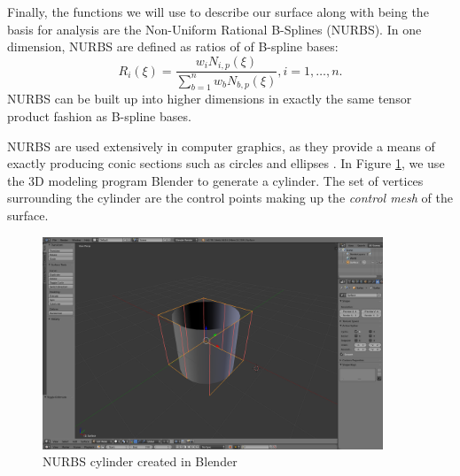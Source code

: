 \documentclass[./]{subfiles}
\begin{document}
Finally, the functions we will use to describe our surface along with being the basis for analysis are the Non-Uniform Rational B-Splines (NURBS). In one dimension, NURBS are defined as ratios of of B-spline bases:
\begin{equation}
R_i(\xi) = \frac{w_i N_{i,p}(\xi)}{\sum_{b=1}^{n} w_b N_{b,p}(\xi)}, i = 1, \dots, n.
\end{equation}
NURBS can be built up into higher dimensions in exactly the same tensor product fashion as B-spline bases. 

NURBS are used extensively in computer graphics, as they provide a means of exactly producing conic sections such as circles and ellipses \cite{piegl_nurbs_2012}. In Figure \ref{fig:cylinder}, we use the 3D modeling program Blender to generate a cylinder. The set of vertices surrounding the cylinder are the control points making up the \textit{control mesh} of the surface. 
\begin{figure}[!htbp]
  \centerline{\includegraphics[width=4in]{./figures/CylinderBlender}}
  \caption{NURBS cylinder created in Blender}
  \label{fig:cylinder}
\end{figure}
\end{document}
